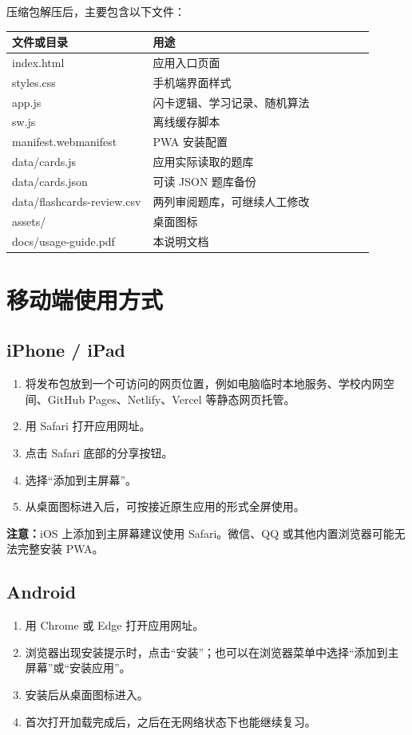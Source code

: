 \documentclass[11pt,a4paper]{ctexart}
\begin{document}
压缩包解压后，主要包含以下文件：

\begin{longtable}{>{\ttfamily}p{0.35\linewidth}p{0.55\linewidth}}
\toprule
文件或目录 & 用途 \\
\midrule
index.html & 应用入口页面 \\
styles.css & 手机端界面样式 \\
app.js & 闪卡逻辑、学习记录、随机算法 \\
sw.js & 离线缓存脚本 \\
manifest.webmanifest & PWA 安装配置 \\
data/cards.js & 应用实际读取的题库 \\
data/cards.json & 可读 JSON 题库备份 \\
data/flashcards-review.csv & 两列审阅题库，可继续人工修改 \\
assets/ & 桌面图标 \\
docs/usage-guide.pdf & 本说明文档 \\
\bottomrule
\end{longtable}

\section{移动端使用方式}

\subsection{iPhone / iPad}
\begin{enumerate}
  \item 将发布包放到一个可访问的网页位置，例如电脑临时本地服务、学校内网空间、GitHub Pages、Netlify、Vercel 等静态网页托管。
  \item 用 Safari 打开应用网址。
  \item 点击 Safari 底部的分享按钮。
  \item 选择“添加到主屏幕”。
  \item 从桌面图标进入后，可按接近原生应用的形式全屏使用。
\end{enumerate}

\textbf{注意：}iOS 上添加到主屏幕建议使用 Safari。微信、QQ 或其他内置浏览器可能无法完整安装 PWA。

\subsection{Android}
\begin{enumerate}
  \item 用 Chrome 或 Edge 打开应用网址。
  \item 浏览器出现安装提示时，点击“安装”；也可以在浏览器菜单中选择“添加到主屏幕”或“安装应用”。
  \item 安装后从桌面图标进入。
  \item 首次打开加载完成后，之后在无网络状态下也能继续复习。
\end{enumerate}
\end{document}
